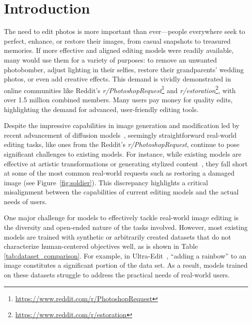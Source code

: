 

\section{Introduction}

The need to edit photos is more important than ever—people everywhere seek to perfect, enhance, or restore their images, from casual snapshots to treasured memories. 
If more effective and aligned editing models were readily available, many would use them for a variety of purposes: to remove an unwanted photobomber, adjust lighting in their selfies, restore their grandparents' wedding photos, or even add creative effects.
This demand is vividly demonstrated in online communities like Reddit’s \textit{r/PhotoshopRequest}\footnote{\url{https://www.reddit.com/r/PhotoshopRequest}} and \textit{r/estoration}\footnote{\url{https://www.reddit.com/r/estoration}}, with over 1.5 million combined members. Many users pay money for quality edits, highlighting the demand for advanced, user-friendly editing tools. 


Despite the impressive capabilities in image generation and modification led by recent advancement of diffusion models~\cite{Ramesh2022DALLE2, rombach2022high, brooks2023instructpix2pix, zhang2024magicbrush}, seemingly straightforward real-world editing tasks, like ones from the Reddit's \textit{r/PhotoshopRequest}, continue to pose significant challenges to existing models.
For instance, while existing models are effective at artistic transformations or generating stylized content~\cite{ zhang2024magicbrush, mokady2023null, krojer2024learning, meng2021sdedit, sheynin2024emu}, they fall short at some of the most common real-world requests such as restoring a damaged image (see Figure~\ref{fig:soldier}). 
This discrepancy highlights a critical misalignment between the capabilities of current editing models and the actual needs of users.

One major challenge for models to effectively tackle real-world image editing is the diversity and open-ended nature of the tasks involved. However, most existing models are trained with synthetic or arbitrarily created datasets that do not characterize human-centered objectives well, as is shown in Table \ref{tab:dataset_comparison}.
For example, in Ultra-Edit~\cite{zhao2024ultraedit}, ``adding a rainbow'' to an image constitutes a significant portion of the data set. As a result, models trained on these datasets struggle to address the practical needs of real-world users.



